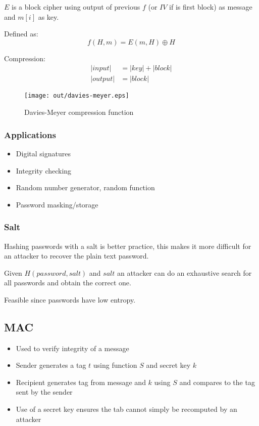 \documentclass[a4paper]{article}
\begin{document}
$E$ is a block cipher using output of previous $f$ (or $IV$ if is first block)
as message and $m[i]$ as key.

Defined as:
\[
  f(H, m) = E(m, H) \oplus H
\]

Compression:
\begin{align*}
   |input| &= |key| + |block| \\
  |output| &= |block|
\end{align*}

\begin{figure}[h!]
  \centering
  \texttt{[image: out/davies-meyer.eps]}
  \caption{Davies-Meyer compression function}
  \label{fig:davies-meyer}
\end{figure}
\FloatBarrier

\subsubsection{Applications}

\begin{itemize}
  \item Digital signatures
  \item Integrity checking
  \item Random number generator, random function
  \item Password masking/storage
\end{itemize}

\subsubsection{Salt}

Hashing passwords with a salt is better practice, this makes it more difficult
for an attacker to recover the plain text password.


Given $H(password, salt)$ and $salt$ an attacker can do an exhaustive search for
all passwords and obtain the correct one.

Feasible since passwords have low entropy.

\subsection{MAC}

\begin{itemize}
  \item Used to verify integrity of a message
  \item Sender generates a tag $t$ using function $S$ and secret key $k$
  \item Recipient generates tag from message and $k$ using $S$ and compares to
        the tag sent by the sender
  \item Use of a secret key ensures the tab cannot simply be recomputed by an
        attacker
\end{itemize}
\end{document}
